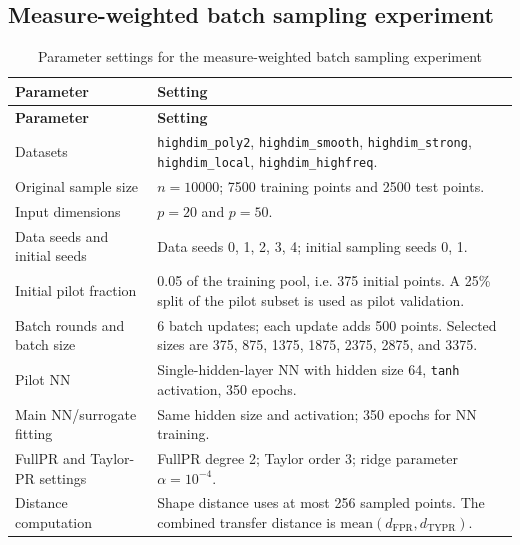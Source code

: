 \documentclass[UTF8,a4paper,11pt]{ctexart}
\begin{document}
\subsection{Measure-weighted batch sampling experiment}

\begin{longtable}{L{0.30\textwidth}L{0.58\textwidth}}
\caption{Parameter settings for the measure-weighted batch sampling experiment}
\label{tab:measure-weighted-parameters} \\
\toprule
\textbf{Parameter} & \textbf{Setting} \\
\midrule
\endfirsthead
\toprule
\textbf{Parameter} & \textbf{Setting} \\
\midrule
\endhead
\bottomrule
\endlastfoot

Datasets
& \texttt{highdim\_poly2}, \texttt{highdim\_smooth}, \texttt{highdim\_strong}, \texttt{highdim\_local}, \texttt{highdim\_highfreq}. \\

Original sample size
& $n=10000$; 7500 training points and 2500 test points. \\

Input dimensions
& $p=20$ and $p=50$. \\

Data seeds and initial seeds
& Data seeds 0, 1, 2, 3, 4; initial sampling seeds 0, 1. \\

Initial pilot fraction
& 0.05 of the training pool, i.e. 375 initial points. A 25\% split of the pilot subset is used as pilot validation. \\

Batch rounds and batch size
& 6 batch updates; each update adds 500 points. Selected sizes are 375, 875, 1375, 1875, 2375, 2875, and 3375. \\

Pilot NN
& Single-hidden-layer NN with hidden size 64, \texttt{tanh} activation, 350 epochs. \\

Main NN/surrogate fitting
& Same hidden size and activation; 350 epochs for NN training. \\

FullPR and Taylor-PR settings
& FullPR degree 2; Taylor order 3; ridge parameter $\alpha=10^{-4}$. \\

Distance computation
& Shape distance uses at most 256 sampled points. The combined transfer distance is $\mathrm{mean}(d_{\mathrm{FPR}},d_{\mathrm{TYPR}})$. \\


\end{longtable}
\end{document}
